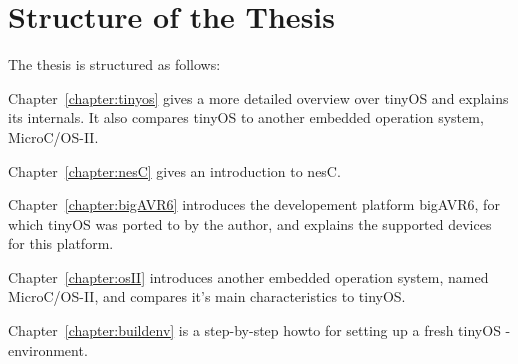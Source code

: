 \section{Structure of the Thesis} \label{sec:introduction:structure}

The thesis is structured as follows:

Chapter~\ref{chapter:tinyos} gives a more detailed overview over tinyOS and explains its internals. It also compares tinyOS to another embedded operation system, MicroC/OS-II.

Chapter~\ref{chapter:nesC} gives an introduction to nesC.  

Chapter~\ref{chapter:bigAVR6} introduces the developement platform bigAVR6, for which tinyOS was ported to by the author, and explains the supported devices for this platform. 

Chapter~\ref{chapter:osII} introduces another embedded operation system, named MicroC/OS-II, and compares it's main characteristics to tinyOS.

Chapter~\ref{chapter:buildenv} is a step-by-step howto for setting up a fresh tinyOS - environment.


